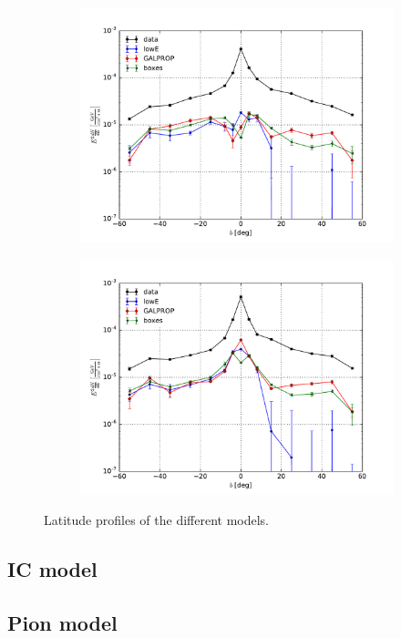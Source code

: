 \begin{figure}[h!]
    \begin{subfigure}{0.5\textwidth}
        \includegraphics[width=\textwidth]{plots/Profiles_left.pdf}
    \end{subfigure} 
    \begin{subfigure}{0.5\textwidth}
        \includegraphics[width=\textwidth]{plots/Profiles_right.pdf}
    \end{subfigure}
  	\caption{Latitude profiles of the different models.}
  	\label{Profiles_all}
\end{figure}

\subsection{IC model}


\subsection{Pion model}